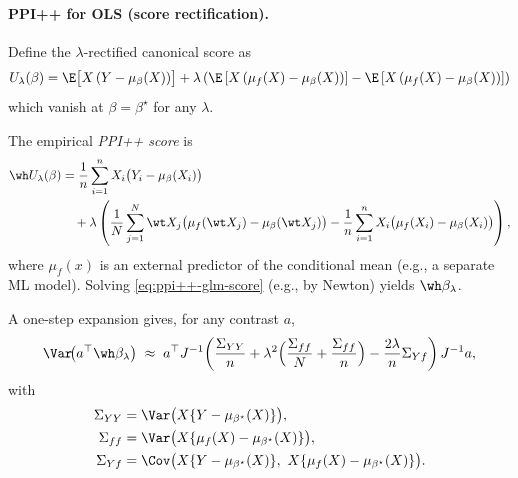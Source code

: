 \paragraph{PPI++ for OLS (score rectification).} \noindent
Define the $\lambda$-rectified canonical score as
\begin{equation*}
U_\lambda(\beta)=\E\big[ X\,(Y-\mu_\beta(X)) \big]+\lambda\left(\E\left[X\left(\mu_f(X)-\mu_\beta(X)\right)\right]-
\E\left[X\left(\mu_f(X)-\mu_\beta(X)\right)\right]\right)
\end{equation*}which vanish at $\beta=\beta^\star$ for any $\lambda$.

\noindent
The empirical \emph{PPI++ score} is
\begin{align}
\wh U_\lambda(\beta)
&=
\frac{1}{n}\sum_{i=1}^n X_i\big(Y_i-\mu_\beta(X_i)\big)\nonumber\\
&\quad+\lambda\left(
\frac{1}{N}\sum_{j=1}^N \wt X_j\big(\mu_f(\wt X_j)-\mu_\beta(\wt X_j)\big)
-
\frac{1}{n}\sum_{i=1}^n X_i\big(\mu_f(X_i)-\mu_\beta(X_i)\big)
\right),\label{eq:ppi++-glm-score}
\end{align}
where $\mu_f(x)$ is an external predictor of the conditional mean (e.g., a separate ML model). Solving \eqref{eq:ppi++-glm-score} (e.g., by Newton) yields $\wh\beta_\lambda$.

A one-step expansion gives, for any contrast $a$,
\begin{equation}\label{eq:ppi++-glm-var}
\Var\!\big(a^\top\wh\beta_\lambda\big)
\;\approx\;
a^\top J^{-1}\!\left(
\frac{\Sigma_{YY}}{n}
+\lambda^2\Big(\frac{\Sigma_{ff}}{N}+\frac{\Sigma_{ff}}{n}\Big)
-\frac{2\lambda}{n}\Sigma_{Yf}
\right)J^{-1}a,
\end{equation}
with
\[
\begin{aligned}
\Sigma_{YY} &= \Var\big(X\{Y - \mu_{\beta^\star}(X)\}\big), \\
\Sigma_{ff} &= \Var\big(X\{\mu_f(X) - \mu_{\beta^\star}(X)\}\big), \\
\Sigma_{Yf} &= \Cov\big(X\{Y - \mu_{\beta^\star}(X)\},\ 
                      X\{\mu_f(X) - \mu_{\beta^\star}(X)\}\big).
\end{aligned}
\]

